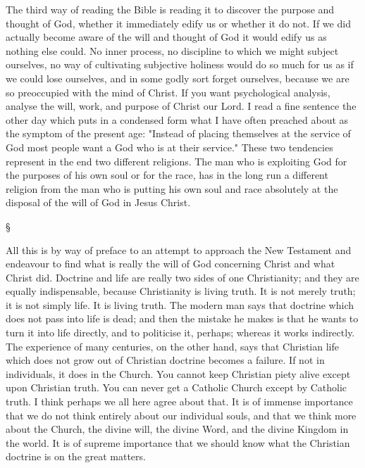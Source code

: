 \documentclass[12pt,a5paper,twoside,titlepage]{book}
\begin{document}
The third way of reading the Bible is reading 
it to discover the purpose and thought of God, 
whether it immediately edify us or whether it 
do not. If we did actually become aware of the 
will and thought of God it would edify us as 
nothing else could. No inner process, no discipline 
to which we might subject ourselves, no 
way of cultivating subjective holiness would do 
so much for us as if we could lose ourselves, and 
in some godly sort forget ourselves, because we 
are so preoccupied with the mind of Christ. If 
you want psychological analysis, analyse the 
will, work, and purpose of Christ our Lord. I 
read a fine sentence the other day which puts in 
a condensed form what I have often preached 
about as the symptom of the present age: 
"Instead of placing themselves at the service 
of God most people want a God who is at their 
service." These two tendencies represent in the 
end two different religions. The man who is 
exploiting God for the purposes of his own soul 
or for the race, has in the long run a different 
religion from the man who is putting his own 
soul and race absolutely at the disposal of the 
will of God in Jesus Christ. 

\begin{center}
\S
\end{center}

All this is by way of preface to an attempt to 
approach the New Testament and endeavour to 
find what is really the will of God concerning 
Christ and what Christ did. Doctrine and life 
are really two sides of one Christianity; and 
they are equally indispensable, because Christianity 
is living truth. It is not merely 
truth; it is not simply life. It is living 
truth. The modern man says that doctrine 
which does not pass into life is dead; 
and then the mistake he makes is that he 
wants to turn it into life directly, and to 
politicise it, perhaps; whereas it works indirectly.
The experience of many centuries, 
on the other hand, says that Christian life 
which does not grow out of Christian doctrine 
becomes a failure. If not in individuals, it 
does in the Church. You cannot keep Christian 
piety alive except upon Christian truth. You 
can never get a Catholic Church except by 
Catholic truth. I think perhaps we all here 
agree about that. It is of immense importance 
that we do not think entirely about our individual 
souls, and that we think more about 
the Church, the divine will, the divine Word, 
and the divine Kingdom in the world. It is 
of supreme importance that we should know 
what the Christian doctrine is on the great 
matters. 
\end{document}
